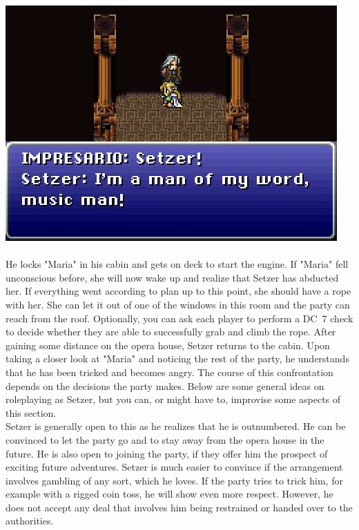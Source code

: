 \includegraphics[width=\columnwidth]{./art/mariaanddraco/setzer.jpg} 
%
\\\\
%
He locks "Maria" in his cabin and gets on deck to start the engine.
If "Maria" fell unconscious before, she will now wake up and realize that Setzer has abducted her.
If everything went according to plan up to this point, she should have a rope with her.
She can let it out of one of the windows in this room and the party can reach from the roof. 
Optionally, you can ask each player to perform a DC~7 check to decide whether they are able to successfully grab and climb the rope.
After gaining some distance on the opera house, Setzer returns to the cabin.
Upon taking a closer look at "Maria" and noticing the rest of the party, he understands that he has been tricked and becomes angry.
The course of this confrontation depends on the decisions the party makes.
Below are some general ideas on roleplaying as Setzer, but you can, or might have to, improvise some aspects of this section.
%
\ofpar
%
\\
Setzer is generally open to this as he realizes that he is outnumbered.
He can be convinced to let the party go and to stay away from the opera house in the future.
He is also open to joining the party, if they offer him the prospect of exciting future adventures.
Setzer is much easier to convince if the arrangement involves gambling of any sort, which he loves.
If the party tries to trick him, for example with a rigged coin toss, he will show even more respect.
However, he does not accept any deal that involves him being restrained or handed over to the authorities.
